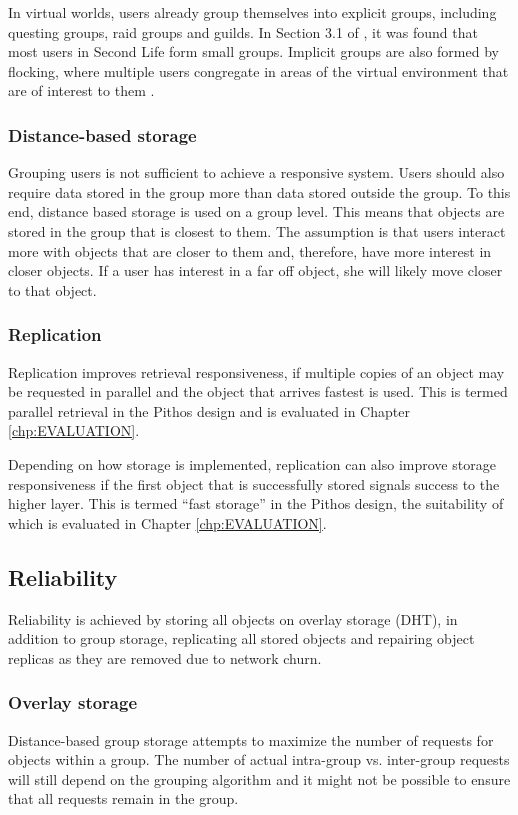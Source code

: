 In virtual worlds, users already group themselves into explicit groups, including questing groups, raid groups and guilds. In Section 3.1 of \cite{varvello_phd}, it was found that most users in Second Life form small groups.  Implicit groups are also formed by flocking, where multiple users congregate in areas of the virtual environment that are of interest to them \cite{flocking}.

\subsubsection{Distance-based storage}
Grouping users is not sufficient to achieve a responsive system. Users should also require data stored in the group more than data stored outside the group. To this end, distance based storage is used on a group level. This means that objects are stored in the group that is closest to them. The assumption is that users interact more with objects that are closer to them and, therefore, have more interest in closer objects. If a user has interest in a far off object, she will likely move closer to that object.

\subsubsection{Replication}

Replication improves retrieval responsiveness, if multiple copies of an object may be requested in parallel and the object that arrives fastest is used. This is termed parallel retrieval in the Pithos design and is evaluated in Chapter \ref{chp:EVALUATION}.

Depending on how storage is implemented, replication can also improve storage responsiveness if the first object that is successfully stored signals success to the higher layer. This is termed ``fast storage'' in the Pithos design, the suitability of which is evaluated in Chapter \ref{chp:EVALUATION}.

\subsection{Reliability}

Reliability is achieved by storing all objects on overlay storage (DHT), in addition to group storage, replicating all stored objects and repairing object replicas as they are removed due to network churn.

\subsubsection{Overlay storage}
Distance-based group storage attempts to maximize the number of requests for objects within a group. The number of actual intra-group vs. inter-group requests will still depend on the grouping algorithm and it might not be possible to ensure that all requests remain in the group.

